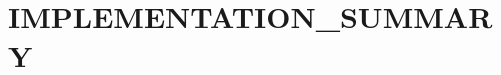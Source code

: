 \chapter{IMPLEMENTATION\+\_\+\+SUMMARY}
\hypertarget{md_IMPLEMENTATION__SUMMARY}{}\label{md_IMPLEMENTATION__SUMMARY}
